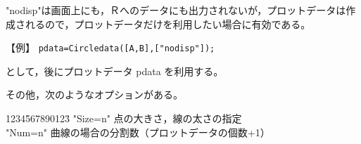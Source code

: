 \documentclass[papersize,a4paper,12pt,uplatex]{jsarticle}
\begin{document}
 "nodisp"は画面上にも，Ｒへのデータにも出力されないが，プロットデータは作成されるので，プロットデータだけを利用したい場合に有効である。
 
\hspace{10mm}【例】  \verb|pdata=Circledata([A,B],["nodisp"]);|

として，後にプロットデータ pdata を利用する。

その他，次のようなオプションがある。
\begin{tabbing}
  1234\=567890123\=\kill
 \>    "Size=n"  \>点の大きさ，線の太さの指定\\
 \>    "Num=n"  \>曲線の場合の分割数（プロットデータの個数+1）\\
\end{tabbing}

\end{document}
